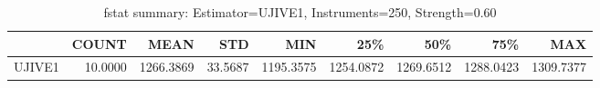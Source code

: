 \begin{table}[ht]
\centering
\caption{fstat summary: Estimator=UJIVE1, Instruments=250, Strength=0.60}
\begin{tabular}{lrrrrrrrr}
\toprule
 & COUNT & MEAN & STD & MIN & 25\% & 50\% & 75\% & MAX \\
\midrule
UJIVE1 & 10.0000 & 1266.3869 & 33.5687 & 1195.3575 & 1254.0872 & 1269.6512 & 1288.0423 & 1309.7377 \\
\bottomrule
\end{tabular}
\end{table}
